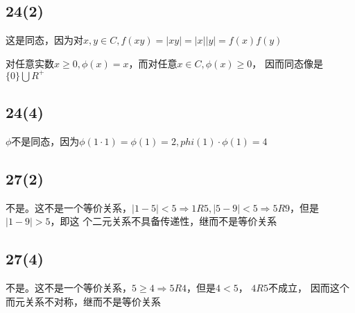\documentclass[UTF8]{ctexart}
\begin{document}
\subsection*{24(2)}

这是同态，因为对$x, y\in C, f(xy) = |xy| = |x||y| = f(x)f(y)$

对任意实数$x\geq 0, \phi(x) = x$，而对任意$x\in C, \phi(x) \geq 0$，
因而同态像是$\{0\}\bigcup R^+$

\subsection*{24(4)}

$\phi$不是同态，因为$\phi(1\cdot 1) = \phi(1) = 2, 
phi(1)\cdot \phi(1) = 4$

\subsection*{27(2)}

不是。这不是一个等价关系，$|1 - 5| < 5\Rightarrow 1R5, 
|5 - 9| < 5\Rightarrow 5R9$，但是$|1 - 9| > 5$，即这
个二元关系不具备传递性，继而不是等价关系

\subsection*{27(4)}

不是。这不是一个等价关系，$5\geq 4\Rightarrow 5R4$，但是$4<5$，
$4R5$不成立，
因而这个而元关系不对称，继而不是等价关系
\end{document}
